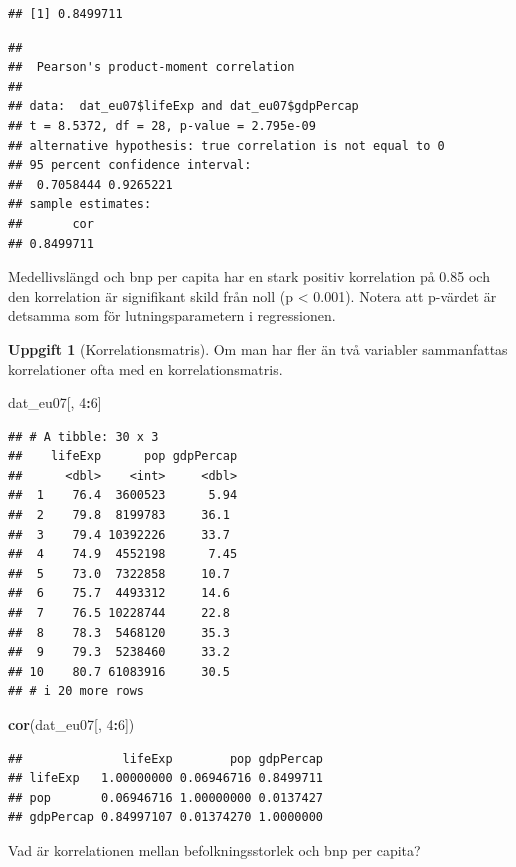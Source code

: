 \documentclass[
]{book}
\newenvironment{Shaded}{\begin{snugshade}}{\end{snugshade}}
\newcommand{\DecValTok}[1]{\textcolor[rgb]{0.00,0.00,0.81}{#1}}
\newcommand{\FunctionTok}[1]{\textcolor[rgb]{0.13,0.29,0.53}{\textbf{#1}}}
\newcommand{\NormalTok}[1]{#1}
\newcommand{\SpecialCharTok}[1]{\textcolor[rgb]{0.81,0.36,0.00}{\textbf{#1}}}
\theoremstyle{definition}
\theoremstyle{definition}
\theoremstyle{definition}
\newtheorem{exercise}{Uppgift}[chapter]
\theoremstyle{definition}
\theoremstyle{remark}
\begin{document}
\begin{verbatim}
## [1] 0.8499711
\end{verbatim}

\begin{Shaded}
\end{Shaded}

\begin{verbatim}
## 
##  Pearson's product-moment correlation
## 
## data:  dat_eu07$lifeExp and dat_eu07$gdpPercap
## t = 8.5372, df = 28, p-value = 2.795e-09
## alternative hypothesis: true correlation is not equal to 0
## 95 percent confidence interval:
##  0.7058444 0.9265221
## sample estimates:
##       cor 
## 0.8499711
\end{verbatim}

Medellivslängd och bnp per capita har en stark positiv korrelation på 0.85 och den korrelation är signifikant skild från noll (p \textless{} 0.001). Notera att p-värdet är detsamma som för lutningsparametern i regressionen.

\begin{exercise}[Korrelationsmatris]
Om man har fler än två variabler sammanfattas korrelationer ofta med en korrelationsmatris.

\begin{Shaded}
\begin{Highlighting}[]
\NormalTok{dat\_eu07[, }\DecValTok{4}\SpecialCharTok{:}\DecValTok{6}\NormalTok{]}
\end{Highlighting}
\end{Shaded}

\begin{verbatim}
## # A tibble: 30 x 3
##    lifeExp      pop gdpPercap
##      <dbl>    <int>     <dbl>
##  1    76.4  3600523      5.94
##  2    79.8  8199783     36.1 
##  3    79.4 10392226     33.7 
##  4    74.9  4552198      7.45
##  5    73.0  7322858     10.7 
##  6    75.7  4493312     14.6 
##  7    76.5 10228744     22.8 
##  8    78.3  5468120     35.3 
##  9    79.3  5238460     33.2 
## 10    80.7 61083916     30.5 
## # i 20 more rows
\end{verbatim}

\begin{Shaded}
\begin{Highlighting}[]
\FunctionTok{cor}\NormalTok{(dat\_eu07[, }\DecValTok{4}\SpecialCharTok{:}\DecValTok{6}\NormalTok{])}
\end{Highlighting}
\end{Shaded}

\begin{verbatim}
##              lifeExp        pop gdpPercap
## lifeExp   1.00000000 0.06946716 0.8499711
## pop       0.06946716 1.00000000 0.0137427
## gdpPercap 0.84997107 0.01374270 1.0000000
\end{verbatim}

Vad är korrelationen mellan befolkningsstorlek och bnp per capita?
\end{exercise}
\end{document}
